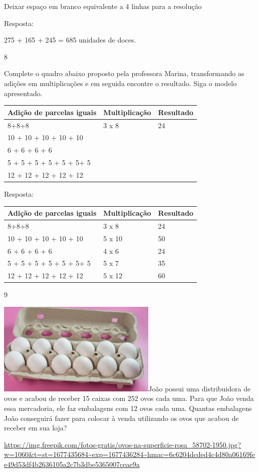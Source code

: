 Deixar espaço em branco equivalente a 4 linhas para a resolução

Resposta:

275 + 165 + 245 = 685 unidades de doces.

\num{8}

Complete o quadro abaixo proposto pela professora Marina, transformando
as adições em multiplicações e em seguida encontre o resultado. Siga o
modelo apresentado.

\begin{longtable}[]{@{}lll@{}}
\toprule
Adição de parcelas iguais & Multiplicação & Resultado\tabularnewline
\midrule
\endhead
8+8+8 & 3 x 8 & 24\tabularnewline
10 + 10 + 10 + 10 + 10 & &\tabularnewline
6 + 6 + 6 + 6 & &\tabularnewline
5 + 5 + 5 + 5 + 5 + 5+ 5 & &\tabularnewline
12 + 12 + 12 + 12 + 12 & &\tabularnewline
\bottomrule
\end{longtable}

Resposta:

\begin{longtable}[]{@{}lll@{}}
\toprule
Adição de parcelas iguais & Multiplicação & Resultado\tabularnewline
\midrule
\endhead
8+8+8 & 3 x 8 & 24\tabularnewline
10 + 10 + 10 + 10 + 10 & 5 x 10 & 50\tabularnewline
6 + 6 + 6 + 6 & 4 x 6 & 24\tabularnewline
5 + 5 + 5 + 5 + 5 + 5+ 5 & 5 x 7 & 35\tabularnewline
12 + 12 + 12 + 12 + 12 & 5 x 12 & 60\tabularnewline
\bottomrule
\end{longtable}

\num{9}

\includegraphics[width=3.00278in,height=1.75833in]{media/image23.png}João
possui uma distribuidora de ovos e acabou de receber 15 caixas com 252
ovos cada uma. Para que João venda essa mercadoria, ele faz embalagens
com 12 ovos cada uma. Quantas embalagens João conseguirá fazer para
colocar à venda utilizando os ovos que acabou de receber em sua loja?

\url{https://img.freepik.com/fotos-gratis/ovos-na-superficie-rosa_58702-1950.jpg?w=1060\&t=st=1677435684~exp=1677436284~hmac=6c6204dcded4c4d80a06169fee49d53df4b2636105a2c7b3dbe5365007ceae9a}

